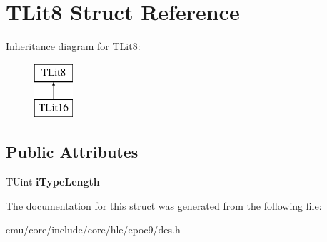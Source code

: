 \hypertarget{struct_t_lit8}{}\section{T\+Lit8 Struct Reference}
\label{struct_t_lit8}
Inheritance diagram for T\+Lit8\+:\begin{figure}[H]
\begin{center}
\leavevmode
\includegraphics[height=2.000000cm]{struct_t_lit8}
\end{center}
\end{figure}
\subsection*{Public Attributes}
\begin{DoxyCompactItemize}
\item 
\mbox{\label{struct_t_lit8_af3ea48166664dfa252abef968a17b6c8}} 
T\+Uint {\bfseries i\+Type\+Length}
\end{DoxyCompactItemize}


The documentation for this struct was generated from the following file\+:\begin{DoxyCompactItemize}
\item 
emu/core/include/core/hle/epoc9/des.\+h\end{DoxyCompactItemize}

